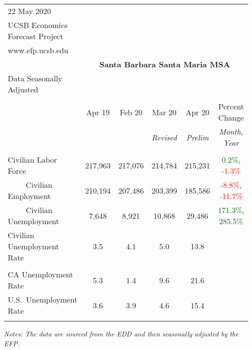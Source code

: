 \documentclass[12pt]{article}
\begin{document}
\begin{table}
\begin{tabular}{|l|c|c|c|c|c|}
\multicolumn{1}{l}{\small 22 May 2020} & \multicolumn{5}{c}{} \\
\multicolumn{1}{l}{\small UCSB Economics Forecast Project} & \multicolumn{5}{c}{} \\
\multicolumn{1}{l}{\small www.efp.ucsb.edu} & \multicolumn{5}{c}{} \\
\multicolumn{1}{c}{} & \multicolumn{5}{c}{\large \textbf{Santa Barbara Santa Maria MSA}} \\
\multicolumn{1}{l}{\small Data Seasonally Adjusted} & \multicolumn{5}{c}{} \\ \hline \hline
& & & & & \\
 & Apr 19 & Feb 20 & Mar 20 & Apr 20 & Percent Change \\
 & & & \small \textit{Revised} & \small \textit{Prelim} & \small \textit{Month, Year} \\ \hline
& & & & & \\
Civilian Labor Force & 217,963 & 217,076 & 214,784 & 215,231 & \textcolor{darkgreen}{0.2\%}, \textcolor{red}{-1.3\%} \\
$\qquad$ \small Civilian Employment & 210,194 & 207,486 & 203,399 & 185,586 & \textcolor{red}{-8.8\%}, \textcolor{red}{-11.7\%} \\
$\qquad$ \small Civilian Unemployment & 7,648 & 8,921 & 10,868 & 29,486 & \textcolor{darkgreen}{171.3\%}, \textcolor{darkgreen}{285.5\%} \\
Civilian Unemployment Rate & 3.5 & 4.1 & 5.0 & 13.8 & \\
& & & & & \\
CA Unemployment Rate & 5.3 & 1.4 & 9.6 & 21.6 & \\
U.S.\ Unemployment Rate & 3.6 & 3.9 & 4.6 & 15.4 & \\
& & & & & \\ \hline \hline
\end{tabular}
\par
\vspace{.5em}
\footnotesize
\textit{Notes: The data are sourced from the EDD and then seasonally adjusted by the EFP.}
\end{table}
\end{document}
